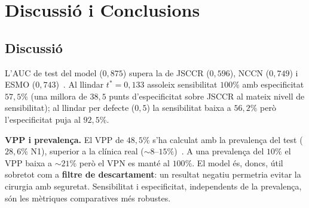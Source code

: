 \documentclass[10pt,a4paper,twocolumn,twoside]{article}
\begin{document}
%

\section{Discussió i Conclusions}

\subsection{Discussió}

L'AUC de test del model ($0{,}875$) supera la de JSCCR ($0{,}596$), NCCN ($0{,}749$) i
ESMO ($0{,}743$)~\cite{tanino2024comparative}. Al llindar $t^*\!=\!0{,}133$ assoleix
sensibilitat $100\%$ amb especificitat $57{,}5\%$ (una millora de $38{,}5$ punts
d'especificitat sobre JSCCR al mateix nivell de sensibilitat); al llindar per defecte
($0{,}5$) la sensibilitat baixa a $56{,}2\%$ però l'especificitat puja al $92{,}5\%$.

\textbf{VPP i prevalença.} El VPP de $48{,}5\%$ s'ha calculat amb la prevalença del test
($28{,}6\%$ N1), superior a la clínica real ($\sim\!8$–$15\%$)~\cite{zaffalon2023}. A una
prevalença del $10\%$ el VPP baixa a $\sim\!21\%$ però el VPN es manté al $100\%$. El model
és, doncs, útil sobretot com a \textbf{filtre de descartament}: un resultat negatiu permetria
evitar la cirurgia amb seguretat. Sensibilitat i especificitat, independents de la prevalença,
són les mètriques comparatives més robustes.
\end{document}
